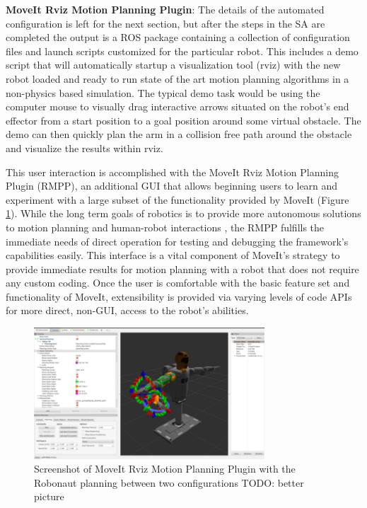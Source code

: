 \documentclass[10pt,journal,compsoc]{joser1}
\begin{document}
{{\bf MoveIt Rviz Motion Planning Plugin}: The details of the automated configuration is left for the next section, but after the steps in the SA are completed the output is a ROS package containing a collection of configuration files and launch scripts customized for the particular robot. This includes a demo script that will automatically startup a visualization tool (rviz) with the new robot loaded and ready to run state of the art motion planning algorithms in a non-physics based simulation. The typical demo task would be using the computer mouse to visually drag interactive arrows situated on the robot's end effector from a start position to a goal position around some virtual obstacle. The demo can then quickly plan the arm in a collision free path around the obstacle and visualize the results within rviz. 

This user interaction is accomplished with the MoveIt Rviz Motion Planning Plugin (RMPP), an additional GUI that allows beginning users to learn and experiment with a large subset of the functionality provided by MoveIt (Figure \ref{fig:motionrvizplugin}). While the long term goals of robotics is to provide more autonomous solutions to motion planning and human-robot interactions \cite{yancotaxonomy}, the RMPP fulfills the immediate needs of direct operation for testing and debugging the framework's capabilities easily. This interface is a vital component of MoveIt's strategy to provide immediate results for motion planning with a robot that does not require any custom coding. Once the user is comfortable with the basic feature set and functionality of MoveIt, extensibility is provided via varying levels of code APIs for more direct, non-GUI, access to the robot's abilities.

\begin{figure}[!t]
\centering
\includegraphics[width=3.4in]{images/rviz_plugin}
\caption{Screenshot of MoveIt Rviz Motion Planning Plugin with the Robonaut planning between two configurations TODO: better picture}
\label{fig:motionrvizplugin}
\end{figure}

}
\end{document}
